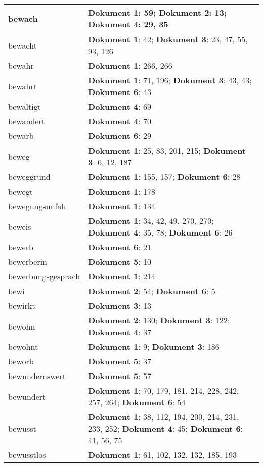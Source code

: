 \documentclass[a5paper]{article}
\begin{document}
\begin{longtable}[l]{|l|p{3in}|}
bewach & \textbf{Dokument 1}: 59; \textbf{Dokument 2}: 13; \textbf{Dokument 4}: 29, 35 \\
\hline
bewacht & \textbf{Dokument 1}: 42; \textbf{Dokument 3}: 23, 47, 55, 93, 126 \\
\hline
bewahr & \textbf{Dokument 1}: 266, 266 \\
\hline
bewahrt & \textbf{Dokument 1}: 71, 196; \textbf{Dokument 3}: 43, 43; \textbf{Dokument 6}: 43 \\
\hline
bewaltigt & \textbf{Dokument 4}: 69 \\
\hline
bewandert & \textbf{Dokument 4}: 70 \\
\hline
bewarb & \textbf{Dokument 6}: 29 \\
\hline
beweg & \textbf{Dokument 1}: 25, 83, 201, 215; \textbf{Dokument 3}: 6, 12, 187 \\
\hline
beweggrund & \textbf{Dokument 1}: 155, 157; \textbf{Dokument 6}: 28 \\
\hline
bewegt & \textbf{Dokument 1}: 178 \\
\hline
bewegungsunfah & \textbf{Dokument 1}: 134 \\
\hline
beweis & \textbf{Dokument 1}: 34, 42, 49, 270, 270; \textbf{Dokument 4}: 35, 78; \textbf{Dokument 6}: 26 \\
\hline
bewerb & \textbf{Dokument 6}: 21 \\
\hline
bewerberin & \textbf{Dokument 5}: 10 \\
\hline
bewerbungsgesprach & \textbf{Dokument 1}: 214 \\
\hline
bewi & \textbf{Dokument 2}: 54; \textbf{Dokument 6}: 5 \\
\hline
bewirkt & \textbf{Dokument 3}: 13 \\
\hline
bewohn & \textbf{Dokument 2}: 130; \textbf{Dokument 3}: 122; \textbf{Dokument 4}: 37 \\
\hline
bewohnt & \textbf{Dokument 1}: 9; \textbf{Dokument 3}: 186 \\
\hline
beworb & \textbf{Dokument 5}: 37 \\
\hline
bewundernswert & \textbf{Dokument 5}: 57 \\
\hline
bewundert & \textbf{Dokument 1}: 70, 179, 181, 214, 228, 242, 257, 264; \textbf{Dokument 6}: 54 \\
\hline
bewusst & \textbf{Dokument 1}: 38, 112, 194, 200, 214, 231, 233, 252; \textbf{Dokument 4}: 45; \textbf{Dokument 6}: 41, 56, 75 \\
\hline
bewusstlos & \textbf{Dokument 1}: 61, 102, 132, 132, 185, 193 \\

\end{longtable}
\end{document}
